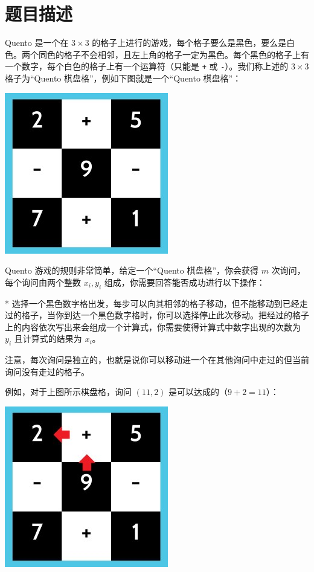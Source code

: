 \documentclass{../cpct/ctpro}
\begin{document}
\makeproblem
\section*{题目描述}

Quento 是一个在 $3 \times 3$ 的格子上进行的游戏，每个格子要么是黑色，要么是白色。两个同色的格子不会相邻，且左上角的格子一定为黑色。每个黑色的格子上有一个数字，每个白色的格子上有一个运算符（只能是 \texttt{+} 或 \texttt{-}）。我们称上述的 $3 \times 3$ 格子为“Quento 棋盘格”，例如下图就是一个“Quento 棋盘格”：

\begin{center}
    \includegraphics{images/quento.jpg}
\end{center}

Quento 游戏的规则非常简单，给定一个“Quento 棋盘格”，你会获得 $m$ 次询问，每个询问由两个整数 $x_i, y_i$ 组成，你需要回答能否成功进行以下操作：

* 选择一个黑色数字格出发，每步可以向其相邻的格子移动，但不能移动到已经走过的格子，当你到达一个黑色数字格时，你可以选择停止此次移动。把经过的格子上的内容依次写出来会组成一个计算式，你需要使得计算式中数字出现的次数为 $y_i$ 且计算式的结果为 $x_i$。

注意，每次询问是独立的，也就是说你可以移动进一个在其他询问中走过的但当前询问没有走过的格子。

例如，对于上图所示棋盘格，询问 $(11, 2)$ 是可以达成的（$9+2=11$）：

\begin{center}
    \includegraphics{images/quento1.jpg}
\end{center}
\end{document}
